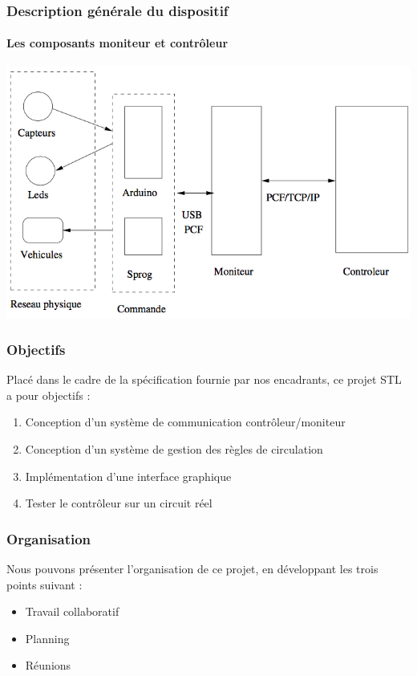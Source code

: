 \begin{frame}
  \frametitle{Description générale du dispositif}
  \framesubtitle{Les composants moniteur et contrôleur}
  \includegraphics[scale=0.45]{include/communication.png}
\end{frame}


\begin{frame}
  \frametitle{Objectifs}
  Placé dans le cadre de la spécification fournie par nos encadrants, ce projet STL
  a pour objectifs :
  \vspace{1em}
  \begin{enumerate}
  \item Conception d'un système de communication contrôleur/moniteur
    \vspace{1em}
  \item Conception d'un système de gestion des règles de circulation
    \vspace{1em}
  \item Implémentation d'une interface graphique
    \vspace{1em}
  \item Tester le contrôleur sur un circuit réel
  \end{enumerate}
\end{frame}

\begin{frame}
  \frametitle{Organisation}
  Nous pouvons présenter l'organisation de ce projet, en développant les trois points suivant :
  \vspace{1em}
  \begin{itemize}
  \item Travail collaboratif
    \vspace{1em}
  \item Planning
    \vspace{1em}
  \item Réunions
  \end{itemize}
\end{frame}

